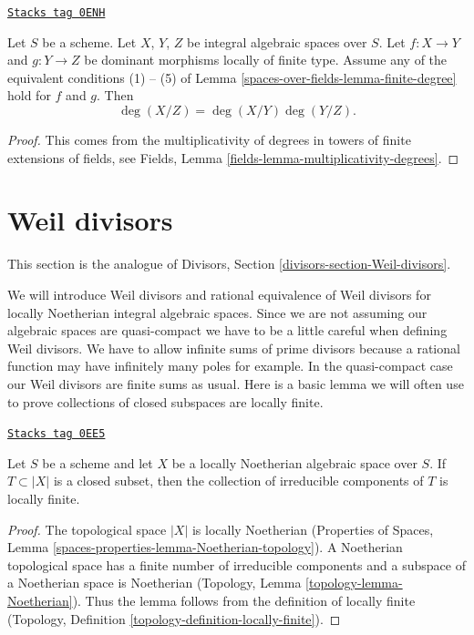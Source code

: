 \begin{lemma}
\label{spaces-over-fields-lemma-degree-composition}
\href{https://stacks.math.columbia.edu/tag/0ENH}{\texttt{Stacks tag 0ENH}}

Let $S$ be a scheme.
Let $X$, $Y$, $Z$ be integral algebraic spaces over $S$.
Let $f : X \to Y$ and $g : Y \to Z$ be dominant morphisms locally
of finite type. Assume any of the equivalent conditions
(1) -- (5) of Lemma \ref{spaces-over-fields-lemma-finite-degree} hold for $f$ and $g$. Then
$$
\deg(X/Z) = \deg(X/Y) \deg(Y/Z).
$$
\end{lemma}

\begin{proof}
This comes from the multiplicativity of degrees in towers
of finite extensions of fields, see
Fields, Lemma \ref{fields-lemma-multiplicativity-degrees}.
\end{proof}

\section{Weil divisors}
\label{spaces-over-fields-section-Weil-divisors}
This section is the analogue of Divisors, Section
\ref{divisors-section-Weil-divisors}.

\medskip\noindent
We will introduce Weil divisors and rational equivalence of Weil
divisors for locally Noetherian integral algebraic spaces.
Since we are not assuming our algebraic spaces are quasi-compact we have
to be a little careful when defining Weil divisors. We have to allow
infinite sums of prime divisors because a rational function may have
infinitely many poles for example. In the quasi-compact case our
Weil divisors are finite sums as usual. Here is a basic lemma we will
often use to prove collections of closed subspaces are locally finite.

\begin{lemma}
\label{spaces-over-fields-lemma-components-locally-finite}
\href{https://stacks.math.columbia.edu/tag/0EE5}{\texttt{Stacks tag 0EE5}}

Let $S$ be a scheme and let $X$ be a locally Noetherian
algebraic space over $S$. If $T \subset |X|$ is a closed subset,
then the collection of irreducible components of $T$ is locally finite.
\end{lemma}

\begin{proof}
The topological space $|X|$ is locally Noetherian
(Properties of Spaces, Lemma \ref{spaces-properties-lemma-Noetherian-topology}).
A Noetherian topological space has a finite number of
irreducible components and a subspace of a Noetherian space is Noetherian
(Topology, Lemma \ref{topology-lemma-Noetherian}).
Thus the lemma follows from the definition of locally finite
(Topology, Definition \ref{topology-definition-locally-finite}).
\end{proof}

